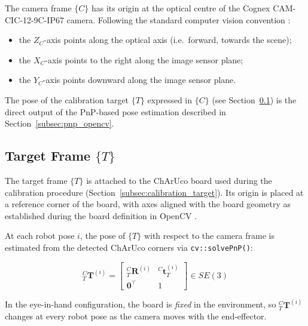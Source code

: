 The camera frame $\{C\}$ has its origin at the optical centre of the Cognex
CAM-CIC-12-9C-IP67 camera. Following the standard computer vision convention
\cite{hartley2004multiple}:

\begin{itemize}
    \item the $Z_C$-axis points along the optical axis (i.e.\ forward,
    towards the scene);
    \item the $X_C$-axis points to the right along the image sensor plane;
    \item the $Y_C$-axis points downward along the image sensor plane.
\end{itemize}

\noindent The pose of the calibration target $\{T\}$ expressed in $\{C\}$
(see Section~\ref{subsec:frame_target}) is the direct output of the
PnP-based pose estimation described in Section~\ref{subsec:pnp_opencv}.

\subsection{Target Frame \texorpdfstring{$\{T\}$}{T}}
\label{subsec:frame_target}

The target frame $\{T\}$ is attached to the ChArUco board used during the
calibration procedure (Section~\ref{subsec:calibration_target}). Its origin is
placed at a reference corner of the board, with axes aligned with the board
geometry as established during the board definition in OpenCV .

At each robot pose $i$, the pose of $\{T\}$ with respect to the camera frame
is estimated from the detected ChArUco corners via \texttt{cv::solvePnP()}:

\begin{equation}
    {}^C_T\mathbf{T}^{(i)} =
    \begin{bmatrix} {}^C_T\mathbf{R}^{(i)} & {}^C\mathbf{t}_T^{(i)} \\
    \mathbf{0}^{\top} & 1 \end{bmatrix} \in SE(3)
    \label{eq:T_CT}
\end{equation}

\noindent In the eye-in-hand configuration, the board is \textit{fixed} in the
environment, so ${}^C_T\mathbf{T}^{(i)}$ changes at every robot pose as the
camera moves with the end-effector.

